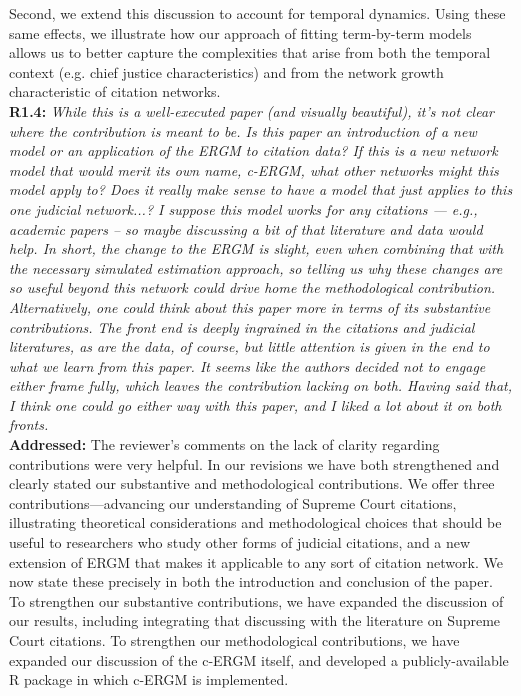 \documentclass[a4paper,11pt]{texMemo}
\begin{document}
Second, we extend this discussion to account for temporal dynamics. Using these same effects, we illustrate how our approach of fitting term-by-term models allows us to better capture the complexities that arise from both the temporal context (e.g. chief justice characteristics) and from the network growth characteristic of citation networks.\\


\noindent \textbf{R1.4:} \emph{ While this is a well-executed paper (and visually beautiful), it’s not clear where the contribution is meant to be. Is this paper an introduction of a new model or an application of the ERGM to citation data?  If this is a new network model that would merit its own name, c-ERGM, what other networks might this model apply to?  Does it really make sense to have a model that just applies to this one judicial network...? I suppose this model works for any citations --- e.g., academic papers -- so maybe discussing a bit of that literature and data would help. In short, the change to the ERGM is slight, even when combining that with the necessary simulated estimation approach, so telling us why these changes are so useful beyond this network could drive home the methodological contribution.  Alternatively, one could think about this paper more in terms of its substantive contributions. The front end is deeply ingrained in the citations and judicial literatures, as are the data, of course, but little attention is given in the end to what we learn from this paper. It seems like the authors decided not to engage either frame fully, which leaves the contribution lacking on both. Having said that, I think one could go either way with this paper, and I liked a lot about it on both fronts. }\\

\noindent \textbf{Addressed:}  The reviewer's comments on the lack of clarity regarding contributions were very helpful. In our revisions we have both strengthened and clearly stated our substantive and methodological contributions. We offer three contributions---advancing our understanding of Supreme Court citations, illustrating theoretical considerations and methodological choices that should be useful to researchers who study other forms of judicial citations, and a new extension of ERGM that makes it applicable to any sort of citation network. We now state these precisely in both the introduction and conclusion of the paper. To strengthen our substantive contributions, we have expanded the discussion of our results, including integrating that discussing with the literature on Supreme Court citations. To strengthen our methodological contributions, we have expanded our discussion of the c-ERGM itself, and developed a publicly-available R package in which c-ERGM is implemented.
\end{document}
